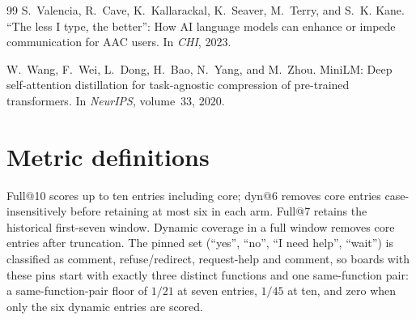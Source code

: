 \begin{thebibliography}{99}
S.~Valencia, R.~Cave, K.~Kallarackal, K.~Seaver, M.~Terry, and S.~K. Kane.
\newblock ``The less I type, the better'': How AI language models can enhance
or impede communication for AAC users.
\newblock In \emph{CHI}, 2023.

W.~Wang, F.~Wei, L.~Dong, H.~Bao, N.~Yang, and M.~Zhou.
\newblock MiniLM: Deep self-attention distillation for task-agnostic compression
of pre-trained transformers.
\newblock In \emph{NeurIPS}, volume~33, 2020.

\end{thebibliography}
\clearpage
\appendix
\section{Metric definitions}\label{app:metrics}

Full@10 scores up to ten entries including core; dyn@6 removes core entries case-insensitively before retaining at most six in each arm. Full@7 retains the historical first-seven window. Dynamic coverage in a full window removes core entries after truncation. %
The pinned set (``yes'', ``no'', ``I need help'', ``wait'') is classified as comment, refuse/redirect, request-help and comment, so boards with these pins start with exactly three distinct functions and one same-function pair: a same-function-pair floor of $1/21$ at seven entries, $1/45$ at ten, and zero when only the six dynamic entries are scored.

